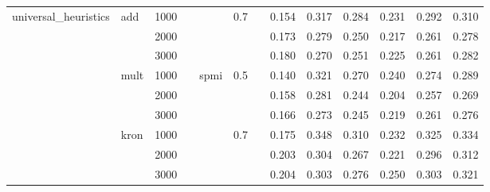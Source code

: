 \begin{tabular}{lllllllrrrrrr}
universal\_heuristics & add & 1000 &   &      & 0.7 &   &        0.154 &         0.317 &           0.284 &            0.231 &             0.292 &       0.310 \\
       & {} & 2000 &   &      &     &   &        0.173 &         0.279 &           0.250 &            0.217 &             0.261 &       0.278 \\
       & {} & 3000 &   &      &     &   &        0.180 &         0.270 &           0.251 &            0.225 &             0.261 &       0.282 \\
       & mult & 1000 &   & spmi & 0.5 &   &        0.140 &         0.321 &           0.270 &            0.240 &             0.274 &       0.289 \\
       & {} & 2000 &   &      &     &   &        0.158 &         0.281 &           0.244 &            0.204 &             0.257 &       0.269 \\
       & {} & 3000 &   &      &     &   &        0.166 &         0.273 &           0.245 &            0.219 &             0.261 &       0.276 \\
       & kron & 1000 &   &      & 0.7 &   &        0.175 &         0.348 &           0.310 &            0.232 &             0.325 &       0.334 \\
       & {} & 2000 &   &      &     &   &        0.203 &         0.304 &           0.267 &            0.221 &             0.296 &       0.312 \\
       & {} & 3000 &   &      &     &   &        0.204 &         0.303 &           0.276 &            0.250 &             0.303 &       0.321 \\
\bottomrule
\end{tabular}
